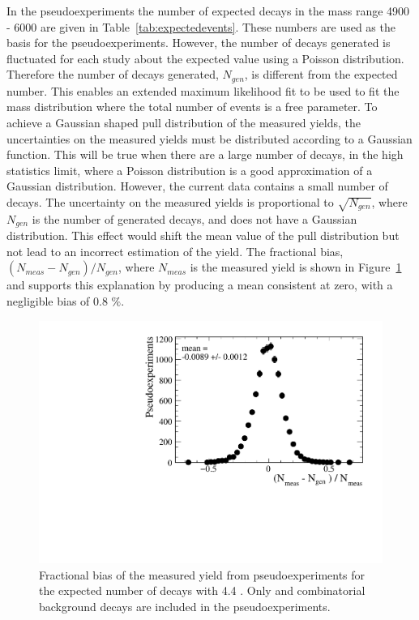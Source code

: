 In the pseudoexperiments the number of expected decays in the mass range 4900 - 6000 \mevcc are given in Table~\ref{tab:expectedevents}. These numbers are used as the basis for the pseudoexperiments. However, the number of decays generated is fluctuated for each study about the expected value using a Poisson distribution. Therefore the number of decays generated, $N_{gen}$, is different from the expected number. This enables an extended maximum likelihood fit to be used to fit the mass distribution where the total number of events is a free parameter. To achieve a Gaussian shaped pull distribution of the measured \bsmumu yields, the uncertainties on the measured yields must be distributed according to a Gaussian function. This will be true when there are a large number of \bsmumu decays, in the high statistics limit, where a Poisson distribution is a good approximation of a Gaussian distribution. However, the current data contains a small number of \bsmumu decays. The uncertainty on the measured yields is proportional to $\sqrt{N_{gen}}$, where $N_{gen}$ is the number of generated decays, and does not have a Gaussian distribution. This effect would shift the mean value of the pull distribution but not lead to an incorrect estimation of the \bsmumu yield. The fractional bias, $(N_{meas} - N_{gen})/N_{gen}$, where $N_{meas}$ is the measured \bsmumu yield is shown in Figure~\ref{fig:FracBias} and supports this explanation by producing a mean consistent at zero, with a negligible bias of 0.8 $\%$. 

\begin{figure}[tbp]
    \centering
        \includegraphics[width=0.6 \textwidth]{./Figs/LifetimeSystematics/Fractional_bias_Bsmumu_yield_CKM.pdf}
    \caption{Fractional bias of the measured \bsmumu yield from pseudoexperiments for the expected number of decays with 4.4 \fb. Only \bsmumu and combinatorial background decays are included in the pseudoexperiments.}
    \label{fig:FracBias}
\end{figure}



